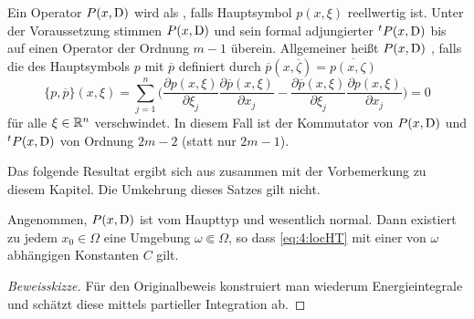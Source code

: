 Ein Operator $P(x,\mathrm D)$ wird als  , falls Hauptsymbol $p(x,\xi)$ reellwertig ist. Unter der Voraussetzung stimmen $P(x,\mathrm D)$ und sein formal adjungierter ${}^tP(x,\mathrm D)$ bis auf einen Operator der Ordnung $m-1$ überein. Allgemeiner heißt $P(x,\mathrm D)$ , falls die   des Hauptsymbols $p$ mit $\overline p$ definiert durch $\overline p(x, \overline\zeta) = \overline{p(x,\zeta)}$
\begin{equation}
    \{ p,\overline p\} (x,\xi) = \sum_{j=1}^n \bigg(\frac{\partial p(x,\xi)}{\partial \xi_j} \frac{\partial \overline p (x,\xi)}{\partial x_j} - \frac{\partial \overline p(x,\xi)}{\partial \xi_j}\frac{\partial  p(x,\xi)}{\partial x_j} \bigg)    = 0 
\end{equation}
für alle $\xi\in\mathbb R^n$ verschwindet. In diesem Fall ist der Kommutator von $P(x,\mathrm D)$ und ${}^tP(x,\mathrm D)$ von Ordnung $2m-2$ (statt nur $2m-1$).

Das folgende Resultat ergibt sich aus \cite[Theorem~4.1]{Hormander:1955} zusammen mit der Vorbemerkung zu diesem Kapitel. Die Umkehrung dieses Satzes gilt nicht.

\begin{thm}
Angenommen, $P(x,\mathrm D)$ ist vom Haupttyp und wesentlich normal. Dann existiert zu jedem $x_0\in\Omega$ eine Umgebung $\omega\Subset\Omega$, so dass
\eqref{eq:4:locHT} mit einer von $\omega$ abhängigen Konstanten $C$ gilt.
\end{thm}
\begin{proof}[Beweisskizze]
Für den Originalbeweis konstruiert man wiederum Energieintegrale und schätzt diese mittels partieller Integration ab.
\end{proof}


